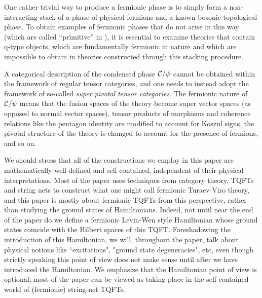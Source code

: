 One rather trivial way to produce a fermionic phase is to simply form a non-interacting stack of a phase of physical fermions 
and a known bosonic topological phase. 
To obtain examples of fermionic phases that do not arise in this way (which are called ``primitive'' in \cite{Lan2016b}),
it is essential to examine theories that contain q-type objects, which are fundamentally fermionic in nature and which are impossible to obtain in theories constructed through this stacking procedure. 

A categorical description of the condensed phase $\mathcal{C} / \psi$ cannot be obtained within the framework 
of regular tensor categories, and one needs to instead adopt the framework of so-called {\it super pivotal tensor categories}. 
The fermionic nature of $\mathcal{C} / \psi$ means that the fusion spaces of the theory become super vector spaces 
(as opposed to normal vector spaces),  
tensor products of morphisms and coherence relations like the pentagon identity are modified to account for Koszul signs, 
the pivotal structure of the theory is changed to account for the presence of fermions, and so on.

We should stress that all of the constructions we employ in this paper are mathematically well-defined and 
self-contained, independent of their physical interpretations. 
Most of the paper uses techniques from category theory, TQFTs and string nets to construct what one
might call fermionic Turaev-Viro theory, and this paper is mostly about fermionic TQFTs from this perspective, 
rather than studying the ground states of Hamiltonians. 
Indeed, not until near the end of the paper do we define a fermionic Levin-Wen style Hamiltonian whose ground states coincide with 
the Hilbert spaces of this TQFT.
Foreshadowing the introduction of this Hamiltonian, we will, throughout the paper, talk about physical notions like ``excitations", "ground state degeneracies", 
etc, even though
strictly speaking this point of view does not make sense until after we have introduced the Hamiltonian.
We emphasize that the Hamiltonian point of view is optional; most of the paper can be viewed as taking place
in the self-contained world of (fermionic) string-net TQFTs.


